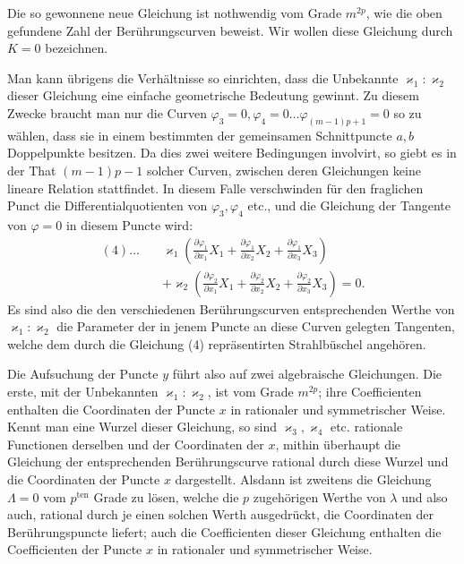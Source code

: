 \documentclass[10pt]{article}
\begin{document}
Die so gewonnene neue Gleichung ist nothwendig vom Grade \(m^{2p}\), wie die oben gefundene Zahl der Berührungscurven beweist. Wir wollen diese Gleichung durch \(K=0\) bezeichnen.

Man kann übrigens die Verhältnisse so einrichten, dass die Unbekannte \(\varkappa_1:\varkappa_2\) dieser Gleichung eine einfache geometrische Bedeutung gewinnt. Zu diesem Zwecke braucht man nur die Curven \(\varphi_3=0,\varphi_4=0\ldots\varphi_{(m-1)p+1}=0\) so zu wählen, dass sie in einem bestimmten der gemeinsamen Schnittpuncte \(a,b\) Doppelpunkte besitzen. Da dies zwei weitere Bedingungen involvirt, so giebt es in der That \((m-1)p-1\) solcher Curven, zwischen deren Gleichungen keine lineare Relation stattfindet. In diesem Falle verschwinden für den fraglichen Punct die Differentialquotienten von \(\varphi_3,\varphi_4\) etc., und die Gleichung der Tangente von \(\varphi=0\) in diesem Puncte wird:
\[
\begin{aligned}
(4)\ldots\quad&
\varkappa_1\left(
\frac{\partial\varphi_1}{\partial x_1}X_1+
\frac{\partial\varphi_1}{\partial x_2}X_2+
\frac{\partial\varphi_1}{\partial x_3}X_3
\right)\\
&+\varkappa_2\left(
\frac{\partial\varphi_2}{\partial x_1}X_1+
\frac{\partial\varphi_2}{\partial x_2}X_2+
\frac{\partial\varphi_2}{\partial x_3}X_3
\right)=0.
\end{aligned}
\]
Es sind also die den verschiedenen Berührungscurven entsprechenden Werthe von \(\varkappa_1:\varkappa_2\) die Parameter der in jenem Puncte an diese Curven gelegten Tangenten, welche dem durch die Gleichung (4) repräsentirten Strahlbüschel angehören.

Die Aufsuchung der Puncte \(y\) führt also auf zwei algebraische Gleichungen. Die erste, mit der Unbekannten \(\varkappa_1:\varkappa_2\), ist vom Grade \(m^{2p}\); ihre Coefficienten enthalten die Coordinaten der Puncte \(x\) in rationaler und symmetrischer Weise. Kennt man eine Wurzel dieser Gleichung, so sind \(\varkappa_3,\varkappa_4\) etc. rationale Functionen derselben und der Coordinaten der \(x\), mithin überhaupt die Gleichung der entsprechenden Berührungscurve rational durch diese Wurzel und die Coordinaten der Puncte \(x\) dargestellt. Alsdann ist zweitens die Gleichung \(\Lambda=0\) vom \(p^{\text{ten}}\) Grade zu lösen, welche die \(p\) zugehörigen Werthe von \(\lambda\) und also auch, rational durch je einen solchen Werth ausgedrückt, die Coordinaten der Berührungspuncte liefert; auch die Coefficienten dieser Gleichung enthalten die Coefficienten der Puncte \(x\) in rationaler und symmetrischer Weise.
\end{document}
